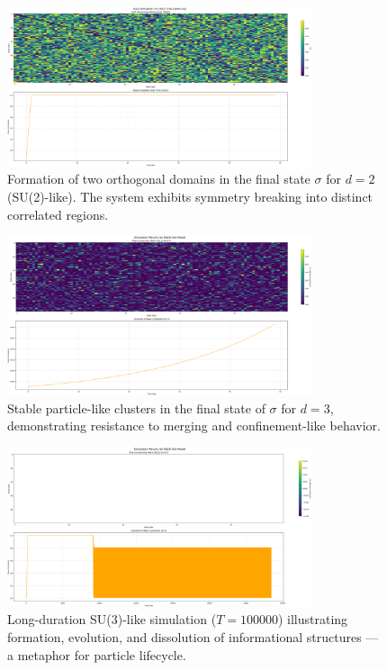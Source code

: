 \documentclass[12pt]{article}
\begin{document}
\begin{figure}[htbp]
\centering
\includegraphics[width=0.8\textwidth]{figures/d2_sigma_matrix.png}
\caption{Formation of two orthogonal domains in the final state \texorpdfstring{$\sigma$}{sigma} for $d=2$ (SU(2)-like). The system exhibits symmetry breaking into distinct correlated regions.}
\end{figure}

\begin{figure}[htbp]
\centering
\includegraphics[width=0.8\textwidth]{figures/d3_sigma_matrix.png}
\caption{Stable particle-like clusters in the final state of \texorpdfstring{$\sigma$}{sigma} for $d=3$, demonstrating resistance to merging and confinement-like behavior.}
\end{figure}

\begin{figure}[htbp]
\centering
\includegraphics[width=0.8\textwidth]{figures/Test_T_100000_d3_sigma_matrix.png}
\caption{Long-duration SU(3)-like simulation ($T=100000$) illustrating formation, evolution, and dissolution of informational structures — a metaphor for particle lifecycle.}
\end{figure}
\end{document}
